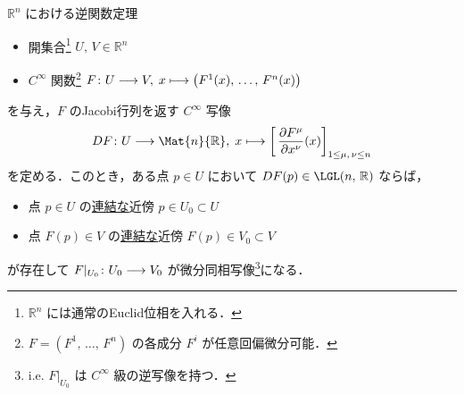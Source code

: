 \documentclass[geometry_main]{subfiles}
\begin{document}
\begin{mytheo}[label=thm:inverse-function-Rn]{$\mathbb{R}^n$ における逆関数定理}
    \begin{itemize}
        \item 開集合\footnote{$\mathbb{R}^n$ には通常のEuclid位相を入れる．} $U,\, V \in \mathbb{R}^n$
        \item $C^\infty$ 関数\footnote{$F = (F^1,\, \dots,\, F^n)$ の各成分 $F^i$ が任意回偏微分可能．} $F \colon U \longrightarrow V,\; x \longmapsto \bigl( F^1(x),\, \dots,\, F^n(x) \bigr)$
    \end{itemize}
    を与え，$F$ のJacobi行列を返す $C^\infty$ 写像
    \begin{align}
        DF \colon U \lto \Mat{n}{\mathbb{R}},\; x \lmto \left[\, \pdv{F^\mu}{x^\nu} ()(x) \right]_{1 \le \mu,\, \nu \le n}
    \end{align}
    を定める．このとき，ある点 $p \in U$ において $DF(p) \in \LGL(n,\, \mathbb{R})$ ならば，
    \begin{itemize}
        \item 点 $p \in U$ の\underline{連結な}近傍 $p \in U_0 \subset U$
        \item 点 $F(p) \in V$ の\underline{連結な}近傍 $F(p) \in V_0 \subset V$
    \end{itemize}
    が存在して $F|_{U_0} \colon U_0 \longrightarrow V_0$ が微分同相写像\footnote{i.e. $F|_{U_0}$ は $C^\infty$ 級の逆写像を持つ．}になる．
\end{mytheo}
\end{document}
